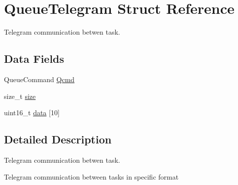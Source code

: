 \hypertarget{struct_queue_telegram}{\section{Queue\+Telegram Struct Reference}
\label{struct_queue_telegram}
}


Telegram communication betwen task.  


\subsection*{Data Fields}
\begin{DoxyCompactItemize}
\item 
Queue\+Command \hyperlink{struct_queue_telegram_a752eb6858a0e18355371dc6cdc559e64}{Qcmd}
\item 
size\+\_\+t \hyperlink{struct_queue_telegram_a5adaf2ba7c2db4f8f198143783d09db3}{size}
\item 
uint16\+\_\+t \hyperlink{struct_queue_telegram_a43b68c4a7f4cee5a8ff61cfe38efc716}{data} \mbox{[}10\mbox{]}
\end{DoxyCompactItemize}


\subsection{Detailed Description}
Telegram communication betwen task. 

Telegram communication between tasks in specific format 

